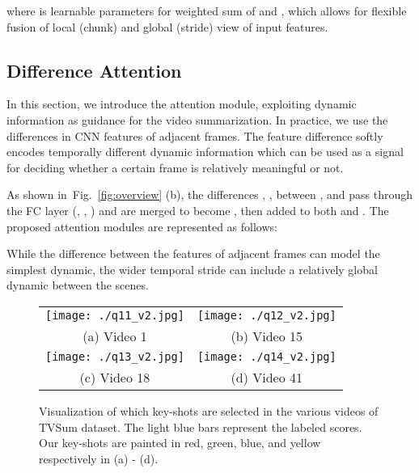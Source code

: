 \documentclass[letterpaper]{article} \usepackage{aaai19}  \usepackage{times}  \usepackage{helvet}  \usepackage{courier}  \usepackage{url}  \usepackage{graphicx}  \frenchspacing  \setlength{\pdfpagewidth}{8.5in}  \setlength{\pdfpageheight}{11in}
\newcommand{\figref}[1]{Fig.~\ref{#1}}
\begin{document}
where  is learnable parameters for weighted sum of  and , which allows for flexible fusion of local (chunk) and global (stride) view of input features. 






\subsection{Difference Attention}

In this section, we introduce the attention module, exploiting dynamic information as guidance for the video summarization. In practice, we use the differences in CNN features of adjacent frames. The feature difference softly encodes temporally different dynamic information which can be used as a signal for deciding whether a certain frame is relatively meaningful or not.

As shown in~\figref{fig:overview} (b), the differences , ,  between , and  pass through the FC layer (, , ) and are merged to become , then added to both  and . The proposed attention modules are represented as follows:


While the difference between the features of adjacent frames can model the simplest dynamic, the wider temporal stride can include a relatively global dynamic between the scenes.







\begin{figure*}[t]
\begin{center}
\def\arraystretch{1.1}
\begin{tabular}{@{}c@{\hskip 0.01\linewidth}c@{}}

    \texttt{[image: ./q11\_v2.jpg]}&
    \texttt{[image: ./q12\_v2.jpg]}\\

{(a) Video 1} & {(b) Video 15}\\


    \texttt{[image: ./q13\_v2.jpg]}&
    \texttt{[image: ./q14\_v2.jpg]}\\

{(c) Video 18} & {(d) Video 41}
\end{tabular}
\end{center}
\caption{Visualization of which key-shots are selected in the various videos of TVSum dataset. The light blue bars represent the labeled scores. Our key-shots are painted in red, green, blue, and yellow respectively in (a) - (d).}
\label{fig:visual}
\end{figure*}
\end{document}
